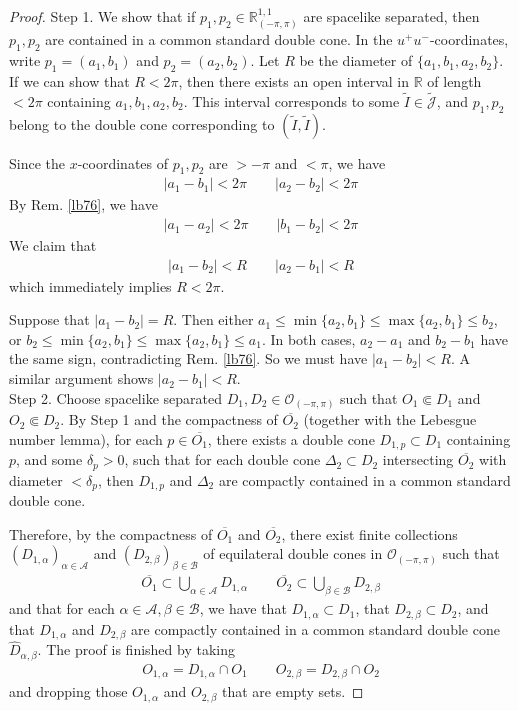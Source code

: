 \documentclass[11pt,b5paper,notitlepage]{article}
\theoremstyle{definition}
\theoremstyle{plain}
\newcommand{\wtd}{\widetilde}
\newcommand{\wht}{\widehat}
\newcommand{\ovl}{\overline}
\newcommand{\scr}{\mathscr}
\newcommand{\Jtd}{\widetilde{\mathcal J}}
\newcommand{\Rbb}{\mathbb R}
\newcommand{\Rpp}{\mathbb R^{1,1}_{(-\pi,\pi)}}
\newcommand{\Opp}{\mathcal O_{(-\pi,\pi)}}
\newcommand{\SB}{\scr B}
\numberwithin{equation}{section}
\begin{document}
\begin{proof}
Step 1. We show that if $p_1,p_2\in\Rpp$ are spacelike separated, then $p_1,p_2$ are contained in a common standard double cone. In the $u^+u^-$-coordinates, write $p_1=(a_1,b_1)$ and $p_2=(a_2,b_2)$. Let $R$ be the diameter of $\{a_1,b_1,a_2,b_2\}$. If we can show that $R<2\pi$, then there exists an open interval in $\Rbb$ of length $<2\pi$ containing $a_1,b_1,a_2,b_2$. This interval corresponds to some $\wtd I\in\Jtd$, and $p_1,p_2$ belong to the double cone corresponding to $(\wtd I,\wtd I)$. 

Since the $x$-coordinates of $p_1,p_2$ are $>-\pi$ and $<\pi$, we have
\begin{align*}
|a_1-b_1|<2\pi\qquad |a_2-b_2|<2\pi
\end{align*}
By Rem. \ref{lb76}, we have
\begin{align*}
|a_1-a_2|<2\pi\qquad |b_1-b_2|<2\pi
\end{align*}
We claim that
\begin{align*}
|a_1-b_2|<R\qquad |a_2-b_1|<R
\end{align*}
which immediately implies $R<2\pi$. 

Suppose that $|a_1-b_2|=R$. Then either $a_1\leq \min\{a_2,b_1\}\leq\max\{a_2,b_1\}\leq b_2$, or $b_2\leq \min\{a_2,b_1\}\leq\max\{a_2,b_1\}\leq a_1$. In both cases, $a_2-a_1$ and $b_2-b_1$ have the same sign, contradicting Rem. \ref{lb76}. So we must have $|a_1-b_2|<R$. A similar argument shows $|a_2-b_1|<R$.\\[-1ex]


Step 2. Choose spacelike separated $D_1,D_2\in\Opp$ such that $O_1\Subset D_1$ and $O_2\Subset D_2$. By Step 1 and the compactness of $\ovl{O_2}$ (together with the Lebesgue number lemma), for each $p\in\ovl{O_1}$, there exists a double cone $D_{1,p}\subset D_1$ containing $p$, and some $\delta_p>0$, such that for each double cone $\Delta_2\subset D_2$ intersecting $\ovl{O_2}$ with diameter $<\delta_p$, then $D_{1,p}$ and $\Delta_2$ are compactly contained in a common standard double cone. 

Therefore, by the compactness of $\ovl{O_1}$ and $\ovl{O_2}$, there exist finite collections $(D_{1,\alpha})_{\alpha\in\scr A}$ and $(D_{2,\beta})_{\beta\in\SB}$ of equilateral double cones in $\Opp$ such that
\begin{align*}
\ovl{O_1}\subset\bigcup_{\alpha\in\scr A} D_{1,\alpha}\qquad \ovl{O_2}\subset\bigcup_{\beta\in\scr B} D_{2,\beta}
\end{align*}
and that for each $\alpha\in\scr A,\beta\in\scr B$, we have that $D_{1,\alpha}\subset D_1$, that $D_{2,\beta}\subset D_2$, and that $D_{1,\alpha}$ and $D_{2,\beta}$ are compactly contained in a common standard double cone $\wht D_{\alpha,\beta}$. The proof is finished by taking
\begin{align*}
O_{1,\alpha}=D_{1,\alpha}\cap O_1\qquad O_{2,\beta}=D_{2,\beta}\cap O_2
\end{align*}
and dropping those $O_{1,\alpha}$ and $O_{2,\beta}$ that are empty sets.
\end{proof} 
\end{document}
